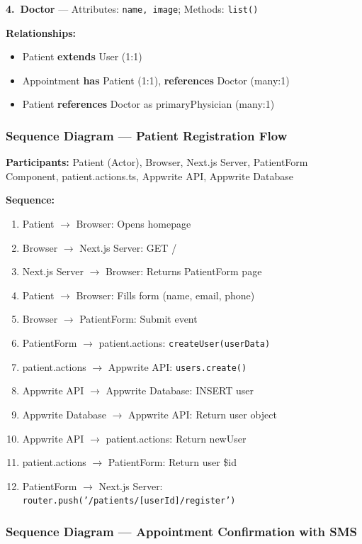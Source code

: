 \documentclass[11pt,a4paper]{article}
\begin{document}
\textbf{4.\ Doctor} --- Attributes: \texttt{name, image}; Methods: \texttt{list()}

\textbf{Relationships:}
\begin{itemize}
    \item Patient \textbf{extends} User (1:1)
    \item Appointment \textbf{has} Patient (1:1), \textbf{references} Doctor (many:1)
    \item Patient \textbf{references} Doctor as primaryPhysician (many:1)
\end{itemize}

\subsubsection{Sequence Diagram --- Patient Registration Flow}

\textbf{Participants:} Patient (Actor), Browser, Next.js Server, PatientForm Component, patient.actions.ts, Appwrite API, Appwrite Database

\textbf{Sequence:}
\begin{enumerate}
    \item Patient $\rightarrow$ Browser: Opens homepage
    \item Browser $\rightarrow$ Next.js Server: GET /
    \item Next.js Server $\rightarrow$ Browser: Returns PatientForm page
    \item Patient $\rightarrow$ Browser: Fills form (name, email, phone)
    \item Browser $\rightarrow$ PatientForm: Submit event
    \item PatientForm $\rightarrow$ patient.actions: \texttt{createUser(userData)}
    \item patient.actions $\rightarrow$ Appwrite API: \texttt{users.create()}
    \item Appwrite API $\rightarrow$ Appwrite Database: INSERT user
    \item Appwrite Database $\rightarrow$ Appwrite API: Return user object
    \item Appwrite API $\rightarrow$ patient.actions: Return newUser
    \item patient.actions $\rightarrow$ PatientForm: Return user \$id
    \item PatientForm $\rightarrow$ Next.js Server: \texttt{router.push('/patients/[userId]/register')}
\end{enumerate}

\subsubsection{Sequence Diagram --- Appointment Confirmation with SMS}
\end{document}
